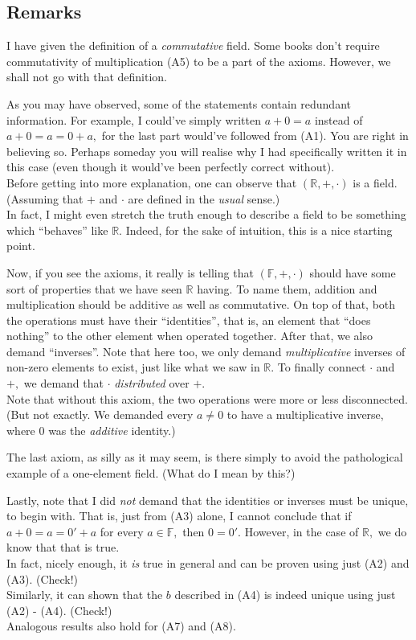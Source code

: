 \documentclass[12pt]{article}
\begin{document}
\subsection{Remarks}
I have given the definition of a \emph{commutative} field. Some books don't require commutativity of multiplication (A5) to be a part of the axioms.  However, we shall not go with that definition. 

As you may have observed, some of the statements contain redundant information. For example, I could've simply written $a + 0 = a$ instead of $a + 0 = a = 0 + a,$ for the last part would've followed from (A1). You are right in believing so. Perhaps someday you will realise why I had specifically written it in this case (even though it would've been perfectly correct without).\\
Before getting into more explanation, one can observe that $(\mathbb{R}, +, \cdot)$ is a field. (Assuming that $+$ and $\cdot$ are defined in the \emph{usual} sense.)\\
In fact, I might even stretch the truth enough to describe a field to be something which ``behaves'' like $\mathbb{R}.$ Indeed, for the sake of intuition, this is a nice starting point.

Now, if you see the axioms, it really is telling that $(\mathbb{F}, +, \cdot)$ should have some sort of properties that we have seen $\mathbb{R}$ having. To name them, addition and multiplication should be additive as well as commutative. On top of that, both the operations must have their ``identities'', that is, an element that ``does nothing'' to the other element when operated together. After that, we also demand ``inverses''. Note that here too, we only demand \emph{multiplicative} inverses of non-zero elements to exist, just like what we saw in $\mathbb{R}.$ To finally connect $\cdot$ and $+,$ we demand that $\cdot$ \emph{distributed} over $+.$\\
Note that without this axiom, the two operations were more or less disconnected. (But not exactly. We demanded every $a \neq 0$ to have a multiplicative inverse, where $0$ was the \emph{additive} identity.)

The last axiom, as silly as it may seem, is there simply to avoid the pathological example of a one-element field. (What do I mean by this?)

Lastly, note that I did \emph{not} demand that the identities or inverses must be unique, to begin with. That is, just from (A3) alone, I cannot conclude that if $a + 0 = a = 0' + a$ for every $a \in \mathbb{F},$ then $0 = 0'.$ However, in the case of $\mathbb{R},$ we do know that that is true.\\
In fact, nicely enough, it \emph{is} true in general and can be proven using just (A2) and (A3). (Check!)\\
Similarly, it can shown that the $b$ described in (A4) is indeed unique using just (A2) - (A4). (Check!)\\
Analogous results also hold for (A7) and (A8).
\end{document}
